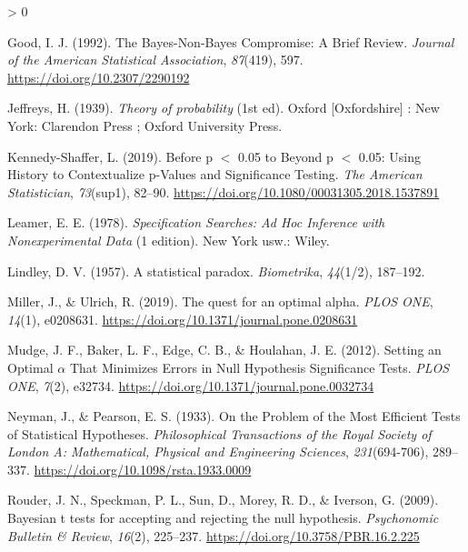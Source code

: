 \documentclass[
  english,
  ,jou, a4paper,floatsintext]{apa6}
\newlength{\cslhangindent}
\newenvironment{CSLReferences}[2] %
 {%
  \setlength{\parindent}{0pt}
  \ifodd #1 \everypar{\setlength{\hangindent}{\cslhangindent}}\ignorespaces\fi
  \ifnum #2 > 0
  \setlength{\parskip}{#2\baselineskip}
  \fi
 }%
 {}
\begin{document}
\begin{CSLReferences}{1}{0}
\leavevmode\hypertarget{ref-good_bayes-non-bayes_1992}{}%
Good, I. J. (1992). The {Bayes}-{Non}-{Bayes Compromise}: {A Brief Review}. \emph{Journal of the American Statistical Association}, \emph{87}(419), 597. \url{https://doi.org/10.2307/2290192}

\leavevmode\hypertarget{ref-jeffreys_theory_1939}{}%
Jeffreys, H. (1939). \emph{Theory of probability} (1st ed). {Oxford {[}Oxfordshire{]} : New York}: {Clarendon Press ; Oxford University Press}.

\leavevmode\hypertarget{ref-kennedy-shaffer_before_2019}{}%
Kennedy-Shaffer, L. (2019). Before p {\(<\)} 0.05 to {Beyond} p {\(<\)} 0.05: {Using History} to {Contextualize} p-{Values} and {Significance Testing}. \emph{The American Statistician}, \emph{73}(sup1), 82--90. \url{https://doi.org/10.1080/00031305.2018.1537891}

\leavevmode\hypertarget{ref-leamer_specification_1978}{}%
Leamer, E. E. (1978). \emph{Specification {Searches}: {Ad Hoc Inference} with {Nonexperimental Data}} (1 edition). {New York usw.}: {Wiley}.

\leavevmode\hypertarget{ref-lindley_statistical_1957}{}%
Lindley, D. V. (1957). A statistical paradox. \emph{Biometrika}, \emph{44}(1/2), 187--192.

\leavevmode\hypertarget{ref-miller_quest_2019}{}%
Miller, J., \& Ulrich, R. (2019). The quest for an optimal alpha. \emph{PLOS ONE}, \emph{14}(1), e0208631. \url{https://doi.org/10.1371/journal.pone.0208631}

\leavevmode\hypertarget{ref-mudge_setting_2012}{}%
Mudge, J. F., Baker, L. F., Edge, C. B., \& Houlahan, J. E. (2012). Setting an {Optimal} {\(\alpha\)} {That Minimizes Errors} in {Null Hypothesis Significance Tests}. \emph{PLOS ONE}, \emph{7}(2), e32734. \url{https://doi.org/10.1371/journal.pone.0032734}

\leavevmode\hypertarget{ref-neyman_problem_1933}{}%
Neyman, J., \& Pearson, E. S. (1933). On the {Problem} of the {Most Efficient Tests} of {Statistical Hypotheses}. \emph{Philosophical Transactions of the Royal Society of London A: Mathematical, Physical and Engineering Sciences}, \emph{231}(694-706), 289--337. \url{https://doi.org/10.1098/rsta.1933.0009}

\leavevmode\hypertarget{ref-rouder_bayesian_2009}{}%
Rouder, J. N., Speckman, P. L., Sun, D., Morey, R. D., \& Iverson, G. (2009). Bayesian t tests for accepting and rejecting the null hypothesis. \emph{Psychonomic Bulletin \& Review}, \emph{16}(2), 225--237. \url{https://doi.org/10.3758/PBR.16.2.225}


\end{CSLReferences}
\end{document}

